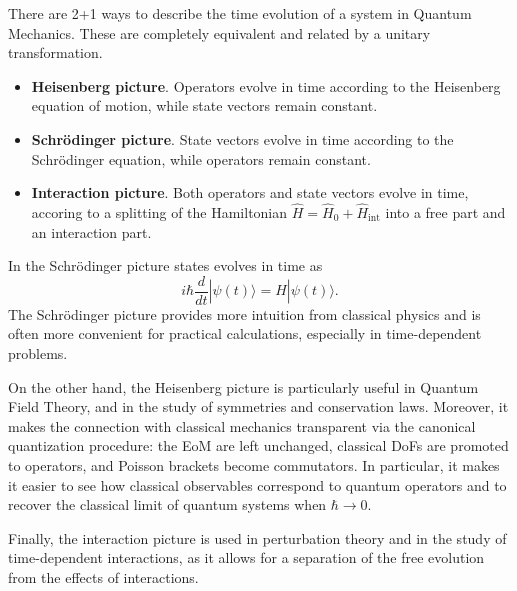 \documentclass[../QFT_main.tex]{subfiles}
\begin{document}
\begin{mytheorem}
There are 2+1 ways to describe the time evolution of a system in Quantum Mechanics.
These are completely equivalent and related by a unitary transformation.
\begin{itemize}
    \item[]\textbf{Heisenberg picture}. Operators evolve in time according to the Heisenberg equation of motion, while state vectors remain constant.
    \item[]\textbf{Schr\"odinger picture}. State vectors evolve in time according to the Schr\"odinger equation, while operators remain constant.
    \item[]\textbf{Interaction picture}. Both operators and state vectors evolve in time, accoring to a splitting of the Hamiltonian $\hat{H} = \hat{H}_0 + \hat{H}_{\text{int}}$ into a free part and an interaction part.
\end{itemize}
In the Schr\"odinger picture states evolves in time as
{\small\begin{equation}
    i\hbar \frac{d}{dt} |\psi(t)\rangle = \hat{H} |\psi(t)\rangle.
\end{equation}}
The Schr\"odinger picture provides more intuition from classical physics and is often more convenient for practical calculations, especially in time-dependent problems.

On the other hand, the Heisenberg picture is particularly useful in Quantum Field Theory, and in the study of symmetries and conservation laws.
Moreover, it makes the connection with classical mechanics transparent via the canonical quantization procedure: the EoM are left unchanged, classical DoFs are promoted to operators, and Poisson brackets become commutators.
In particular, it makes it easier to see how classical observables correspond to quantum operators and to recover the classical limit of quantum systems when $\hbar \to 0$.

Finally, the interaction picture is used in perturbation theory and in the study of time-dependent interactions, as it allows for a separation of the free evolution from the effects of interactions.
\end{mytheorem}
\end{document}
